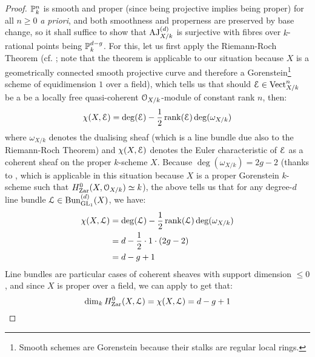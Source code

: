             \begin{proof}
                $\P^n_k$ is smooth and proper (since being projective implies being proper) for all $n \geq 0$ \textit{a priori}, and both smoothness and properness are preserved by base change, so it shall suffice to show that $\AJ_{X/k}^{(d)}$ is surjective with fibres over $k$-rational points being $\P^{d - g}_k$. For this, let us first apply the Riemann-Roch Theorem (cf. \cite[\href{https://stacks.math.columbia.edu/tag/0BS6}{Tag 0BS6}]{stacks}; note that the theorem is applicable to our situation because $X$ is a geometrically connected smooth projective curve and therefore a Gorenstein\footnote{Smooth schemes are Gorenstein because their stalks are regular local rings.} scheme of equidimension $1$ over a field), which tells us that should $\E \in \Vect_{X/k}^n$ be a be a locally free quasi-coherent $\calO_{X/k}$-module of constant rank $n$, then:
                    $$\chi(X, \E) = \deg(\E) - \frac12\rank(\E) \deg(\omega_{X/k})$$
                where $\omega_{X/k}$ denotes the dualising sheaf (which is a line bundle due also to the Riemann-Roch Theorem) and $\chi(X, \E)$ denotes the Euler characteristic of $\E$ as a coherent sheaf on the proper $k$-scheme $X$. Because $\deg(\omega_{X/k}) = 2g - 2$ (thanks to \cite[\href{https://stacks.math.columbia.edu/tag/0C19}{Tag 0C19}]{stacks}, which is applicable in this situation because $X$ is a proper Gorenstein $k$-scheme such that $H^0_{\Zar}(X, \calO_{X/k}) \cong k$), the above tells us that for any degree-$d$ line bundle $\calL \in \Bun_{\GL_1}^{(d)}(X)$, we have:
                    $$
                        \begin{aligned}
                            \chi(X, \calL) & = \deg(\calL) - \frac12 \rank(\calL) \deg(\omega_{X/k})
                            \\
                            & = d - \frac12 \cdot 1 \cdot (2g - 2)
                            \\
                            & = d - g + 1
                        \end{aligned}
                    $$
                Line bundles are particular cases of coherent sheaves with support dimension $\leq 0$, and since $X$ is proper over a field, we can apply \cite[\href{https://stacks.math.columbia.edu/tag/0AYT}{Tag 0AYT}]{stacks} to get that:
                    $$\dim_k H^0_{\Zar}(X, \calL) = \chi(X, \calL) = d - g + 1$$
                
            \end{proof}

